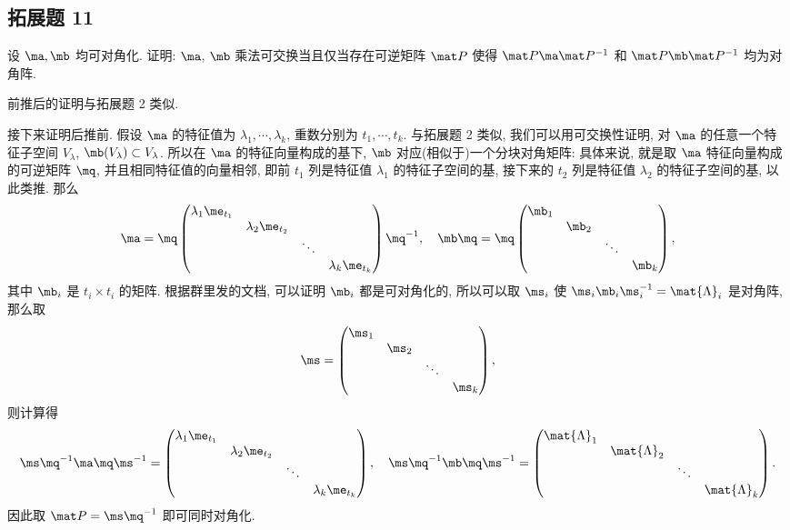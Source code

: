 \subsection*{ 拓展题 11 }
\begin{problem*}
设 $\ma, \mb$ 均可对角化. 证明: $\ma$, $\mb$ 乘法可交换当且仅当存在可逆矩阵 $\mpp$ 使得 $\mpp \ma \mpp^{-1}$ 和 $\mpp \mb \mpp^{-1}$ 均为对角阵.
\end{problem*}
\begin{solution}
    前推后的证明与拓展题 2 类似.
    
    接下来证明后推前. 假设 $\ma$ 的特征值为 $\lambda_1, \cdots, \lambda_k$, 重数分别为 $t_1, \cdots, t_k$. 与拓展题 2 类似, 我们可以用可交换性证明, 对 $\ma$ 的任意一个特征子空间 $V_{\lambda}$, $\mb(V_{\lambda}) \subset V_{\lambda}$. 所以在 $\ma$ 的特征向量构成的基下, $\mb$ 对应(相似于)一个分块对角矩阵: 具体来说, 就是取 $\ma$ 特征向量构成的可逆矩阵 $\mq$, 并且相同特征值的向量相邻, 即前 $t_1$ 列是特征值 $\lambda_1$ 的特征子空间的基, 接下来的 $t_2$ 列是特征值 $\lambda_2$ 的特征子空间的基, 以此类推. 那么
    \[
    \ma = \mq \begin{pmatrix}
        \lambda_1 \me_{t_1} & & & \\
        & \lambda_2 \me_{t_2} & & \\
        & & \ddots & \\
        & & & \lambda_k \me_{t_k}
    \end{pmatrix} \mq^{-1},
    \quad 
    \mb \mq = \mq \begin{pmatrix}
        \mb_1 & & & \\
        & \mb_2 & & \\
        & & \ddots & \\
        & & & \mb_k
    \end{pmatrix},
    \]
    其中 $\mb_i$ 是 $t_i \times t_i$ 的矩阵. 根据群里发的文档, 可以证明 $\mb_i$ 都是可对角化的, 所以可以取 $\ms_i$ 使 $\ms_i \mb_i \ms_i^{-1} = \mat{\Lambda}_i$ 是对角阵, 那么取
    \[
    \ms = \begin{pmatrix}
        \ms_1 & & & \\
        & \ms_2 & & \\
        & & \ddots & \\
        & & & \ms_k
    \end{pmatrix},
    \]
    则计算得
    \[
    \ms \mq^{-1} \ma \mq \ms^{-1} = \begin{pmatrix}
        \lambda_1 \me_{t_1} & & & \\
        & \lambda_2 \me_{t_2} & & \\
        & & \ddots & \\
        & & & \lambda_k \me_{t_k}
    \end{pmatrix}, \quad 
    \ms \mq^{-1} \mb \mq \ms^{-1} = \begin{pmatrix}
        \mat{\Lambda}_1 & & & \\
        & \mat{\Lambda}_2 & & \\
        & & \ddots & \\
        & & & \mat{\Lambda}_k
    \end{pmatrix}.
    \]
    因此取 $\mpp = \ms \mq^{-1}$ 即可同时对角化.
\end{solution}

